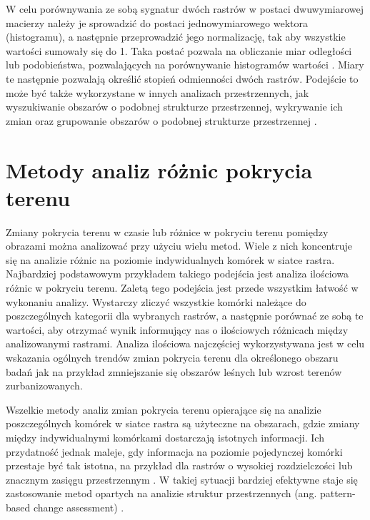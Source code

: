 \documentclass{amuthesis}
\begin{document}
W celu porównywania ze sobą sygnatur dwóch rastrów w postaci
dwuwymiarowej macierzy należy je sprowadzić do postaci jednowymiarowego
wektora (histogramu), a następnie przeprowadzić jego normalizację, tak
aby wszystkie wartości sumowały się do 1. Taka postać pozwala na
obliczanie miar odległości lub podobieństwa, pozwalających na
porównywanie histogramów wartości \autocite{Cha2007}. Miary te następnie
pozwalają określić stopień odmienności dwóch rastrów. Podejście to może
być także wykorzystane w innych analizach przestrzennych, jak
wyszukiwanie obszarów o podobnej strukturze przestrzennej, wykrywanie
ich zmian oraz grupowanie obszarów o podobnej strukturze przestrzennej
\autocite{Jasiewicz_GeoPAT,nowosad_motif}.

\hypertarget{sec-pattern-based}{%
\section{Metody analiz różnic pokrycia terenu}\label{sec-pattern-based}}

Zmiany pokrycia terenu w czasie lub różnice w pokryciu terenu pomiędzy
obrazami można analizować przy użyciu wielu metod. Wiele z nich
koncentruje się na analizie różnic na poziomie indywidualnych komórek w
siatce rastra. Najbardziej podstawowym przykładem takiego podejścia jest
analiza ilościowa różnic w pokryciu terenu. Zaletą tego podejścia jest
przede wszystkim łatwość w wykonaniu analizy. Wystarczy zliczyć
wszystkie komórki należące do poszczególnych kategorii dla wybranych
rastrów, a następnie porównać ze sobą te wartości, aby otrzymać wynik
informujący nas o ilościowych różnicach między analizowanymi rastrami.
Analiza ilościowa najczęściej wykorzystywana jest w celu wskazania
ogólnych trendów zmian pokrycia terenu dla określonego obszaru badań jak
na przykład zmniejszanie się obszarów leśnych lub wzrost terenów
zurbanizowanych.

Wszelkie metody analiz zmian pokrycia terenu opierające się na analizie
poszczególnych komórek w siatce rastra są użyteczne na obszarach, gdzie
zmiany między indywidualnymi komórkami dostarczają istotnych informacji.
Ich przydatność jednak maleje, gdy informacja na poziomie pojedynczej
komórki przestaje być tak istotna, na przykład dla rastrów o wysokiej
rozdzielczości lub znacznym zasięgu przestrzennym
\autocite{Jasiewicz_GeoPAT}. W takiej sytuacji bardziej efektywne staje
się zastosowanie metod opartych na analizie struktur przestrzennych
(ang. pattern-based change assessment) \autocite{Netzel2015}.
\end{document}
